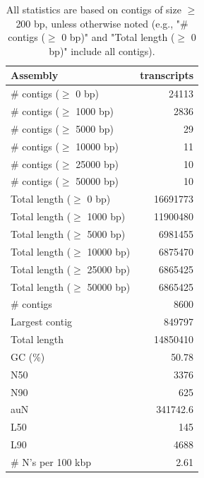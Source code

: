 \documentclass[12pt,a4paper]{article}
\begin{document}
\begin{table}[ht]
\begin{center}
\caption{All statistics are based on contigs of size $\geq$ 200 bp, unless otherwise noted (e.g., "\# contigs ($\geq$ 0 bp)" and "Total length ($\geq$ 0 bp)" include all contigs).}
\begin{tabular}{|l*{1}{|r}|}
\hline
Assembly & transcripts \\ \hline
\# contigs ($\geq$ 0 bp) & 24113 \\ \hline
\# contigs ($\geq$ 1000 bp) & 2836 \\ \hline
\# contigs ($\geq$ 5000 bp) & 29 \\ \hline
\# contigs ($\geq$ 10000 bp) & 11 \\ \hline
\# contigs ($\geq$ 25000 bp) & 10 \\ \hline
\# contigs ($\geq$ 50000 bp) & 10 \\ \hline
Total length ($\geq$ 0 bp) & 16691773 \\ \hline
Total length ($\geq$ 1000 bp) & 11900480 \\ \hline
Total length ($\geq$ 5000 bp) & 6981455 \\ \hline
Total length ($\geq$ 10000 bp) & 6875470 \\ \hline
Total length ($\geq$ 25000 bp) & 6865425 \\ \hline
Total length ($\geq$ 50000 bp) & 6865425 \\ \hline
\# contigs & 8600 \\ \hline
Largest contig & 849797 \\ \hline
Total length & 14850410 \\ \hline
GC (\%) & 50.78 \\ \hline
N50 & 3376 \\ \hline
N90 & 625 \\ \hline
auN & 341742.6 \\ \hline
L50 & 145 \\ \hline
L90 & 4688 \\ \hline
\# N's per 100 kbp & 2.61 \\ \hline
\end{tabular}
\end{center}
\end{table}
\end{document}
